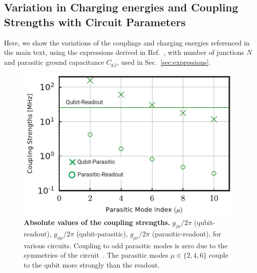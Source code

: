 \documentclass[%
reprint,
superscriptaddress,
 amsmath,amssymb,
 aps,
 prx,
longbibliography,
floatfix,
]{revtex4-2}
\begin{document}
\subsection{Variation in Charging energies and Coupling Strengths with Circuit Parameters}\label{app:coupling}
Here, we show the variations of the couplings and charging energies referenced in the main text, using the expressions derived in Ref.~\cite{viola2015collective}, with number of junctions $N$ and parasitic ground capacitance $C_\textrm{g,j}$, used in Sec.~\ref{sec:expressions}. \begin{figure}[tbh]
    \centering
    \includegraphics[width=\linewidth]{Supp_Fig/Coupling-strength.pdf}
    \caption{{\bf Absolute values of the coupling strengths.} $g_{\phi \textrm{r}}/2\pi$ (qubit-readout), $g_{\phi\mu}/2\pi$ (qubit-parasitic), $g_{\mu r}/2\pi$ (parasitic-readout), for various circuits. Coupling to odd parasitic modes is zero due to the symmetries of the circuit~\cite{viola2015collective}. The parasitic modes $\mu\in\{2,4,6\}$ couple to the qubit more strongly than the readout.}
    \label{fig:coupling-strength}
\end{figure}
\end{document}
